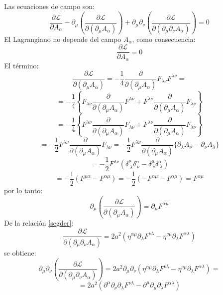 \documentclass[a4paper,12pt]{article}
\begin{document}
Las ecuaciones de campo son:
\begin{equation}
\frac{\partial\mathscr{L} }{\partial A_\alpha}-\partial_{\mu}\left(\frac{\partial\mathscr{L} }{\partial(\partial_{\mu} A_\alpha)}\right)+\partial_{\mu}\partial_{\nu}\left(\frac{\partial\mathscr{L} }{\partial(\partial_{\mu}\partial_{\nu} A_\alpha)}\right)=0 
\end{equation}
El Lagrangiano no depende del campo $A_\alpha$, como consecuencia:
\begin{equation}
\frac{\partial\mathscr{L} }{\partial A_\alpha}=0 
\end{equation}
El término:
\begin{equation}
\frac{\partial\mathscr{L} }{\partial(\partial_{\mu} A_\alpha)}=-\frac{1}{4}\frac{\partial }{\partial(\partial_{\mu} A_\alpha)} F_{\lambda \nu}F^{\lambda \nu}=
\end{equation}
$$=-\frac{1}{4}\left\{F_{\lambda \nu}\frac{\partial }{\partial(\partial_{\mu} A_\alpha)}F^{\lambda \nu}+F^{\lambda \nu}\frac{\partial }{\partial(\partial_{\mu} A_\alpha)}F_{\lambda \nu}\right\}$$
$$=-\frac{1}{4}\left\{F^{\lambda \nu}\frac{\partial }{\partial(\partial_{\mu} A_\alpha)}F_{\lambda \nu}+F^{\lambda \nu}\frac{\partial }{\partial(\partial_{\mu} A_\alpha)}F_{\lambda \nu}\right\}$$
$$=-\frac{1}{2}F^{\lambda \nu}\frac{\partial }{\partial(\partial_{\mu} A_\alpha)}F_{\lambda \nu}=-\frac{1}{2}F^{\lambda \nu}\frac{\partial }{\partial(\partial_{\mu} A_\alpha)}\{\partial_\lambda A_\nu-\partial_\nu A_\lambda\}$$
$$=-\frac{1}{2}F^{\lambda \nu}(\delta^{\mu}_{\ \lambda}\delta^{\alpha}_{\ \nu}-\delta^{\mu}_{\ \nu}\delta^{\alpha}_{\ \lambda})$$
$$=-\frac{1}{2}(F^{\mu\alpha}-F^{\alpha\mu})=-\frac{1}{2}(-F^{\alpha\mu}-F^{\alpha\mu})=F^{\alpha\mu}$$
por lo tanto:
\begin{equation}
\partial_{\mu}\left(\frac{\partial\mathscr{L} }{\partial(\partial_{\mu} A_\alpha)}\right)=\partial_{\mu}F^{\alpha\mu} 
\end{equation}
De la relación \eqref{segder}:
\begin{equation}
\frac{\partial \mathscr{L} }{\partial(\partial_{\mu}\partial_{\nu} A_\alpha)}= 2a^2(\eta^{\alpha\mu}\partial_\lambda F^{\nu\lambda}-\eta^{\nu\mu}\partial_\lambda F^{\alpha\lambda})
\end{equation}
se obtiene:
$$\partial_{\mu}\partial_{\nu}\left(\frac{\partial\mathscr{L} }{\partial(\partial_{\mu}\partial_{\nu} A_\alpha)}\right)=2a^2\partial_{\mu}\partial_{\nu}(\eta^{\alpha\mu}\partial_\lambda F^{\nu\lambda}-\eta^{\nu\mu}\partial_\lambda F^{\alpha\lambda})=$$
$$=2a^2(\partial^{\alpha}\partial_{\nu}\partial_\lambda F^{\nu\lambda}-\partial^{\mu}\partial_{\mu}\partial_\lambda F^{\alpha\lambda})$$
\end{document}

